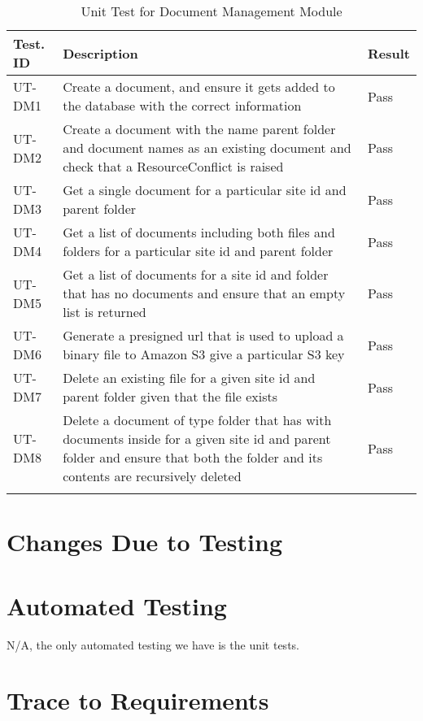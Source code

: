 \documentclass[12pt, titlepage]{article}
\begin{document}
\begin{longtable}{|m{2cm}|m{10cm}|m{1.4cm}|}
  \hline
  \textbf{Test. ID} & \textbf{Description} & \textbf{Result} \\ \hline
  UT-DM1 & Create a document, and ensure it gets added to the
  database with the correct information & Pass\\ \hline
  UT-DM2 & Create a document with the name parent folder and document names as
  an existing document and check that a ResourceConflict is raised &
  Pass\\ \hline
  UT-DM3 & Get a single document for a particular site id and parent
  folder & Pass\\ \hline
  UT-DM4 & Get a list of documents including both files and folders for a
  particular site id and parent folder & Pass\\ \hline
  UT-DM5 & Get a list of documents for a site id and folder that has no
  documents and ensure that an empty list is returned & Pass\\ \hline
  UT-DM6 & Generate a presigned url that is used to upload a binary file to
  Amazon S3 give a particular S3 key & Pass\\ \hline
  UT-DM7 & Delete an existing file for a given site id and parent folder given
  that the file exists & Pass\\ \hline
  UT-DM8 & Delete a document of type folder that has with documents
  inside for a given site id
  and parent folder and ensure that both the folder and its contents are
  recursively deleted & Pass\\ \hline
  \caption{Unit Test for Document Management Module}
\end{longtable}

\section{Changes Due to Testing}


\section{Automated Testing}
N/A, the only automated testing we have is the unit tests.

\section{Trace to Requirements}
\end{document}
